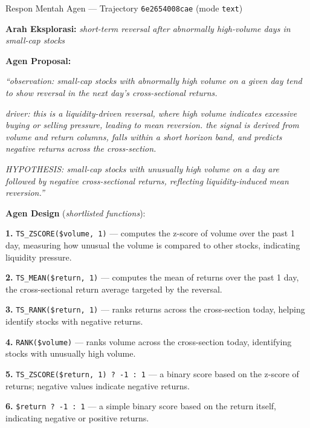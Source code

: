 \vspace{4mm}
\begin{kotakrespon}{Respon Mentah Agen --- Trajectory \texttt{6e2654008cae} (mode \texttt{text})}

\textbf{Arah Eksplorasi:} \textit{short-term reversal after abnormally
high-volume days in small-cap stocks}

\vspace{2mm}
\textbf{Agen Proposal:}\par
\textit{``observation: small-cap stocks with abnormally high volume on a
given day tend to show reversal in the next day's cross-sectional
returns.}

\textit{driver: this is a liquidity-driven reversal, where high volume
indicates excessive buying or selling pressure, leading to mean
reversion. the signal is derived from volume and return columns, falls
within a short horizon band, and predicts negative returns across the
cross-section.}

\textit{HYPOTHESIS: small-cap stocks with unusually high volume on a day
are followed by negative cross-sectional returns, reflecting
liquidity-induced mean reversion.''}

\vspace{2mm}
\textbf{Agen Design} (\textit{shortlisted functions}):

\noindent\textbf{1.} \texttt{TS\_ZSCORE(\$volume, 1)} --- computes the
z-score of volume over the past 1 day, measuring how unusual the volume
is compared to other stocks, indicating liquidity pressure.\par
\noindent\textbf{2.} \texttt{TS\_MEAN(\$return, 1)} --- computes the mean
of returns over the past 1 day, the cross-sectional return average
targeted by the reversal.\par
\noindent\textbf{3.} \texttt{TS\_RANK(\$return, 1)} --- ranks returns
across the cross-section today, helping identify stocks with negative
returns.\par
\noindent\textbf{4.} \texttt{RANK(\$volume)} --- ranks volume across the
cross-section today, identifying stocks with unusually high volume.\par
\noindent\textbf{5.} \texttt{TS\_ZSCORE(\$return, 1) ? -1 : 1} --- a
binary score based on the z-score of returns; negative values indicate
negative returns.\par
\noindent\textbf{6.} \texttt{\$return ? -1 : 1} --- a simple binary score
based on the return itself, indicating negative or positive returns.


\end{kotakrespon}
